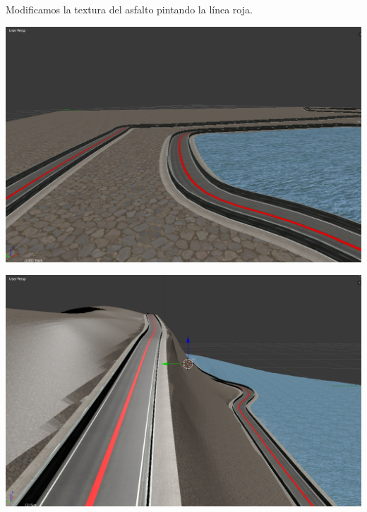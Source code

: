 \documentclass[notes,slidesec,a4]{seminar}
\begin{document}
\begin{hslide}
	Modificamos la textura del asfalto pintando la línea roja.
	
	\begin{minipage}{0.5\textwidth}
		\includegraphics[width=\textwidth]{monacolinea.png}
	\end{minipage}
	\begin{minipage}{0.51\textwidth}
		\includegraphics[width=\textwidth]{monacoelevlinea.png}
	\end{minipage}
\end{hslide}
\end{document}
